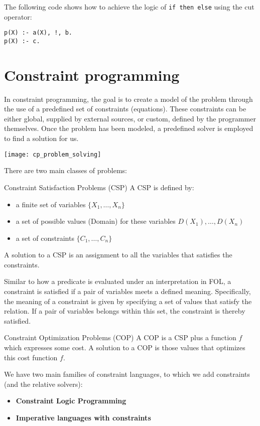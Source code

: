 \documentclass{article}
\begin{document}
\begin{example}
    The following code shows how to achieve the logic of \texttt{if
    then else} using the cut operator:
    \begin{verbatim}
p(X) :- a(X), !, b.
p(X) :- c.
    \end{verbatim}
\end{example}
\cleardoublepage
\section{Constraint programming}

In constraint programming, the goal is to create a model of the problem
through the use of a predefined set of constraints (equations). These
constraints can be either global, supplied by external sources, or custom,
defined by the programmer themselves. Once the problem has been modeled, a
predefined solver is employed to find a solution for us.

\begin{center}
    \texttt{[image: cp\_problem\_solving]}
\end{center}

There are two main classes of problems:
\begin{Definition}{Constraint Satisfaction Problems (CSP)}{}
    A CSP is defined by:
    \begin{itemize}
        \item a finite set of variables $\{X_1,\ldots,X_n\}$ 
        \item a set of possible values (Domain) for these variables
            $D(X_1),\ldots, D(X_n)$
        \item a set of constraints $\{C_1,\ldots,C_n\}$
    \end{itemize}
    A solution to a CSP is an assignment to all the variables that satisfies
    the constraints.

\end{Definition}
Similar to how a predicate is evaluated under an interpretation in FOL, a
constraint is satisfied if a pair of variables meets a defined meaning.
Specifically, the meaning of a constraint is given by specifying a set of
values that satisfy the relation. If a pair of variables belongs within this
set, the constraint is thereby satisfied.
\begin{Definition}{Constraint Optimization Problems (COP)}{}
    A COP is a CSP plus a function $f$ which expresses some cost. A solution
    to a COP is those values that optimizes this cost function $f$.
\end{Definition}
\newpage
We have two main families of constraint languages, to which we add constraints
(and the relative solvers):
\begin{itemize}
    \item \textbf{Constraint Logic Programming}
    \item \textbf{Imperative languages with constraints}
\end{itemize}
\end{document}
